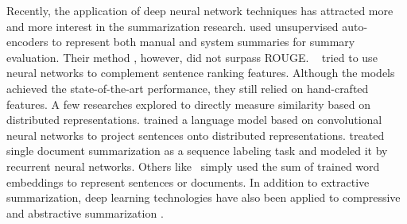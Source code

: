 \documentclass[letterpaper]{article}
\begin{document}
Recently, the application of deep neural network techniques has attracted more and more interest in the summarization research. 
\cite{genest2011deep} used unsupervised auto-encoders to represent both manual and system summaries for summary evaluation.
Their method , however, did not surpass ROUGE.
~\cite{cao2015ranking,cao2015learning} tried to use neural networks to complement sentence ranking features.
Although the models achieved the state-of-the-art performance, they still relied on hand-crafted features.
A few researches explored to directly measure similarity based on distributed representations.
\cite{yin2015optimizing} trained a language model based on convolutional neural networks to project sentences onto distributed representations.
\cite{cheng2016neural} treated single document summarization as a sequence labeling task and modeled it by recurrent neural networks.
Others like~\cite{kobayashi-noguchi-yatsuka:2015:EMNLP} simply used the sum of trained word embeddings to represent sentences or documents.
In addition to extractive summarization, deep learning technologies have also been applied to compressive and abstractive summarization \cite{filippova-EtAl:2015:EMNLP,rush-chopra-weston:2015:EMNLP}.
\end{document}
